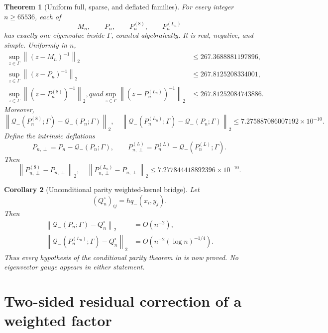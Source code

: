 \documentclass[11pt]{article}
\newtheorem{theorem}{Theorem}[section]
\newtheorem{corollary}[theorem]{Corollary}
\theoremstyle{definition}
\theoremstyle{remark}
\newcommand{\cQ}{\mathcal Q}
\newcommand{\norm}[1]{\left\lVert #1\right\rVert}
\begin{document}
\begin{theorem}[Uniform full, sparse, and deflated families]
\label{thm:uniform-family}
For every integer $n\ge65536$, each of
\[
 M_n,\qquad P_n,\qquad P_n^{(8)},\qquad P_n^{(L_n)}
\]
has exactly one eigenvalue inside $\Gamma$, counted algebraically.  It is
real, negative, and simple.  Uniformly in $n$,
\begin{align}
 \sup_{z\in\Gamma}\norm{(z-M_n)^{-1}}_2
 &\le267.3688881197896,
 \label{eq:uniform-midpoint-resolvent}\\
 \sup_{z\in\Gamma}\norm{(z-P_n)^{-1}}_2
 &\le267.8125208334001,
 \label{eq:uniform-full-resolvent}\\
 \sup_{z\in\Gamma}\norm{(z-P_n^{(8)})^{-1}}_2,quad
 \sup_{z\in\Gamma}\norm{(z-P_n^{(L_n)})^{-1}}_2
 &\le267.81252084743886.
 \label{eq:uniform-sparse-resolvent}
\end{align}
Moreover,
\begin{equation}
 \norm{\cQ_-(P_n^{(8)};\Gamma)-\cQ_-(P_n;\Gamma)}_2,
 \quad
 \norm{\cQ_-(P_n^{(L_n)};\Gamma)-\cQ_-(P_n;\Gamma)}_2
 \le7.275887086007192\times10^{-10}.
 \label{eq:uniform-weighted-cutoff}
\end{equation}
Define the intrinsic deflations
\[
 P_{n,\perp}=P_n-\cQ_-(P_n;\Gamma),
 \qquad
 P_{n,\perp}^{(L)}
 =P_n^{(L)}-\cQ_-(P_n^{(L)};\Gamma).
\]
Then
\begin{equation}
 \norm{P_{n,\perp}^{(8)}-P_{n,\perp}}_2,
 \quad
 \norm{P_{n,\perp}^{(L_n)}-P_{n,\perp}}_2
 \le7.277844418892396\times10^{-10}.
 \label{eq:uniform-deflated-cutoff}
\end{equation}
\end{theorem}

\begin{corollary}[Unconditional parity weighted-kernel bridge]
\label{cor:weighted-bridge}
Let
\[
 (Q_n^\circ)_{ij}=h q_-(x_i,y_j).
\]
Then
\begin{align}
 \norm{\cQ_-(P_n;\Gamma)-Q_n^\circ}_2
 &=O(n^{-2}),
 \label{eq:full-second-order}\\
 \norm{\cQ_-(P_n^{(L_n)};\Gamma)-Q_n^\circ}_2
 &=O\!\left(n^{-2}(\log n)^{-1/4}\right).
 \label{eq:adaptive-second-order}
\end{align}
Thus every hypothesis of the conditional parity theorem in
\citet{WangRiesz2026} is now proved.  No eigenvector gauge appears in either
statement.
\end{corollary}

\section{Two-sided residual correction of a weighted factor}
\label{sec:factor-correction}
\end{document}
